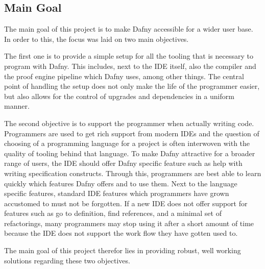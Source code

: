 \subsection{Main Goal}\label{mainGoal}

The main goal of this project is to make Dafny accessible for a wider user base. In order to this, the focus was laid on two main objectives. \newline

The first one is to provide a simple setup for all the tooling that is necessary to program with Dafny. This includes, next to the IDE itself, also the compiler and the proof engine pipeline which Dafny uses, among other things. The central point of handling the setup does not only make the life of the programmer easier, but also allows for the control of upgrades and dependencies in a uniform manner. \newline

The second objective is to support the programmer when actually writing code. Programmers are used to get rich support from modern IDEs and the question of choosing of a programming language for a project is often interwoven with the quality of tooling behind that language. To make Dafny attractive for a broader range of users, the IDE should offer Dafny specific feature such as help with writing specification constructs. Through this, programmers are best able to learn quickly which features Dafny offers and to use them. Next to the language specific features, standard IDE features which programmers have grown accustomed to must not be forgotten. If a new IDE does not offer support for features such as go to definition, find references, and a minimal set of refactorings, many programmers may stop using it after a short amount of time because the IDE does not support the work flow they have gotten used to. \newline

The main goal of this project therefor lies in providing robust, well working solutions regarding these two objectives. \newline